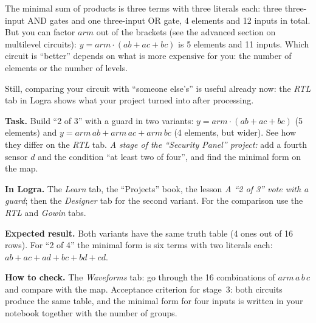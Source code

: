 The minimal sum of products is three terms with three literals each: three
three-input AND gates and one three-input OR gate, 4 elements and 12 inputs
in total. But you can factor $arm$ out of the brackets (see the advanced
section on multilevel circuits): $y=arm\cdot(ab+ac+bc)$ is 5 elements and 11
inputs. Which circuit is ``better'' depends on what is more expensive for
you: the number of elements or the number of levels.

\begin{infobox}
\end{infobox}

Still, comparing your circuit with ``someone else's'' is useful already now:
the \emph{RTL} tab in Logra shows what your project turned into
after processing.

\begin{diybox}
\textbf{Task.}  Build ``2 of 3'' with a guard in two variants:
$y=arm\cdot(ab+ac+bc)$ (5 elements) and $y=arm\,ab+arm\,ac+arm\,bc$
(4 elements, but wider).  See how they differ on the \emph{RTL} tab.
 \emph{A stage of the ``Security Panel'' project:} add a fourth
sensor $d$ and the condition ``at least two of four'', and find the minimal
form on the map.

\textbf{In Logra.} The \emph{Learn} tab, the ``Projects'' book, the lesson
\emph{A ``2 of 3'' vote with a guard}; then the \emph{Designer} tab for the
second variant. For the comparison use the \emph{RTL} and \emph{Gowin} tabs.

\textbf{Expected result.} Both variants have the same truth table
(4 ones out of 16 rows). For ``2 of 4'' the minimal form is six terms with
two literals each: $ab+ac+ad+bc+bd+cd$.

\textbf{How to check.} The \emph{Waveforms} tab: go through the 16
combinations of $arm\,a\,b\,c$ and compare with the map. Acceptance
criterion for stage~3: both circuits produce the same table, and the minimal
form for four inputs is written in your notebook together with the number of
groups.
\end{diybox}

